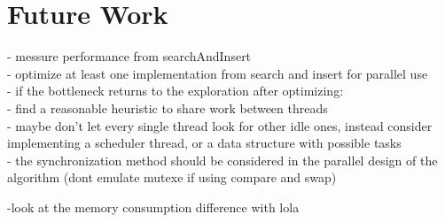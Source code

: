 \chapter{Future Work}
- messure performance from searchAndInsert\\
- optimize at least one implementation from search and insert for parallel use\\
- if the bottleneck returns to the exploration after optimizing:\\
- find a reasonable heuristic to share work between threads\\
- maybe don't let every single thread look for other idle ones, instead consider implementing a scheduler thread, or a data structure with possible tasks\\

- the synchronization method should be considered in the parallel design of the algorithm (dont emulate mutexe if using compare and swap)

-look at the memory consumption difference with lola
